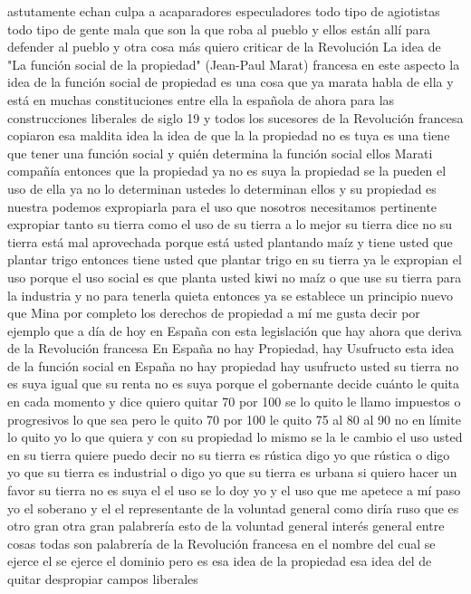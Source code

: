 astutamente echan culpa a acaparadores especuladores todo tipo de agiotistas todo tipo de gente mala
que son la que roba al pueblo y ellos están allí para defender al pueblo y otra cosa más quiero criticar de la Revolución
La idea de "La función social de la propiedad" (Jean-Paul Marat)
francesa en este aspecto la idea de la función social de propiedad
es una cosa que ya marata habla de ella y está en muchas constituciones entre ella la española de ahora para las construcciones liberales de siglo 19
y todos los sucesores de la Revolución francesa copiaron esa maldita idea la idea de que la la propiedad no es tuya
es una tiene que tener una función social y quién determina la función social ellos Marati compañía
entonces que la propiedad ya no es suya la propiedad se la pueden el uso de ella ya no lo determinan ustedes
lo determinan ellos y su propiedad es nuestra podemos expropiarla para el uso que nosotros necesitamos pertinente
expropiar tanto su tierra como el uso de su tierra a lo mejor su tierra dice no su tierra está mal aprovechada porque está usted plantando maíz
y tiene usted que plantar trigo entonces tiene usted que plantar trigo en su tierra ya le expropian el uso porque el uso social es que planta usted kiwi no maíz
o que use su tierra para la industria y no para tenerla quieta entonces ya se establece un principio nuevo que Mina por completo los derechos de propiedad
a mí me gusta decir por ejemplo que a día de hoy en España con esta legislación que hay ahora que deriva de la Revolución francesa
En España no hay Propiedad, hay Usufructo
esta idea de la función social en España no hay propiedad hay usufructo usted su tierra no es suya
igual que su renta no es suya porque el gobernante decide cuánto le quita en cada momento y dice quiero quitar 70 por 100
se lo quito le llamo impuestos o progresivos lo que sea pero le quito 70 por 100 le quito 75 al 80 al 90 no en límite lo quito yo lo que quiera
y con su propiedad lo mismo se la le cambio el uso usted en su tierra quiere puedo decir no
su tierra es rústica digo yo que rústica o digo yo que su tierra es industrial o digo yo que su tierra es urbana
si quiero hacer un favor su tierra no es suya el el uso se lo doy yo y el uso que me apetece a mí paso yo el soberano y el
el representante de la voluntad general como diría ruso que es otro gran otra gran palabrería esto de la voluntad general
interés general entre cosas todas son palabrería de la Revolución francesa en el nombre del cual se ejerce el
se ejerce el dominio pero es esa idea de la propiedad esa idea del de quitar despropiar campos liberales
